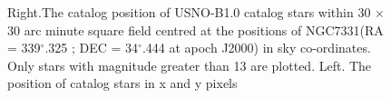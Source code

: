 \documentclass[letterpaper,12pt]{article}
\begin{document}
\begin{figure}[h!]
                                                                                                                                                                                                                                                                                                                                                                                                                                                                                                                                                                                                                                                                                                                                                                                                                                                                                                                                                                                \caption{Right.The catalog position of USNO-B1.0 catalog stars within 30 \begin{math} \times \end{math} 30 arc minute square field centred at the positions of NGC7331(RA = 339\begin{math} ^{\circ} \end{math}.325 ; DEC = 34\begin{math} ^{\circ} \end{math}.444 at apoch J2000) in sky co-ordinates. Only stars with magnitude greater than 13 are plotted. Left. The position of catalog stars in x and y pixels}   

\end{figure}
\end{document}
